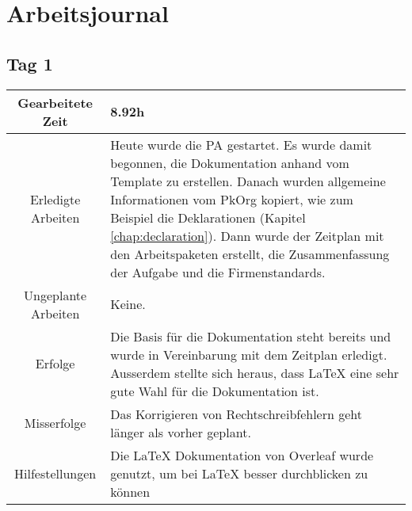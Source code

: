 \chapter{Arbeitsjournal}

\section{Tag 1}
\begin{tabularx}{\textwidth}[H]{|c|X|}
  \hline
  Gearbeitete Zeit & 8.92h \\ \hline
  Erledigte Arbeiten & Heute wurde die PA gestartet. Es wurde damit begonnen, die Dokumentation anhand vom Template
  \cite{Buhler_ipa-template_2022} zu erstellen. Danach wurden allgemeine Informationen vom PkOrg kopiert, wie zum
  Beispiel die Deklarationen (Kapitel \ref{chap:declaration}).
  Dann wurde der Zeitplan mit den Arbeitspaketen erstellt, die Zusammenfassung der Aufgabe und die
  Firmenstandards. \\ \hline
  Ungeplante Arbeiten & Keine. \\ \hline
  Erfolge & Die Basis für die Dokumentation steht bereits und wurde in Vereinbarung mit dem Zeitplan erledigt. Ausserdem stellte
  sich heraus, dass LaTeX eine sehr gute Wahl für die Dokumentation ist.
  \\ \hline
  Misserfolge & Das Korrigieren von Rechtschreibfehlern geht länger als vorher geplant.  \\ \hline
  Hilfestellungen & Die LaTeX Dokumentation von Overleaf \cite{overleaf} wurde genutzt, um bei LaTeX besser durchblicken zu
  können \\ \hline
\end{tabularx}

\newpage


